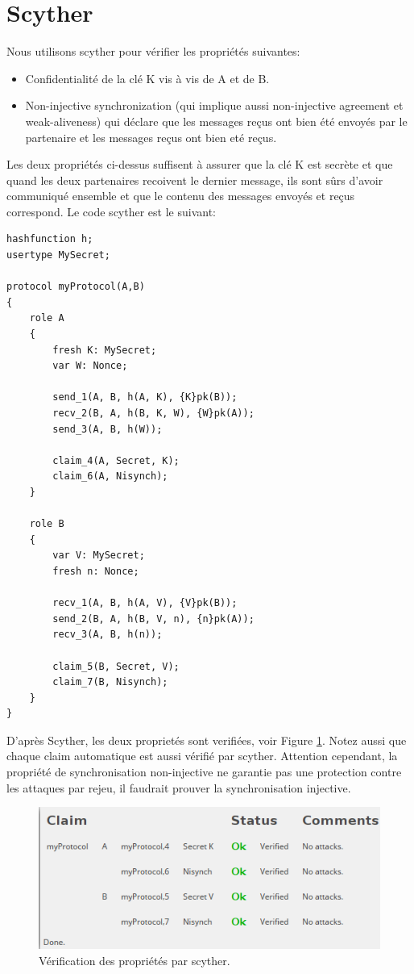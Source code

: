 \documentclass[10pt,a4paper]{article}
\begin{document}
\section{Scyther}
Nous utilisons scyther pour vérifier les propriétés suivantes:
\begin{itemize}
 \item Confidentialité de la clé K vis à vis de A et de B.
 \item Non-injective synchronization (qui implique aussi non-injective agreement et weak-aliveness) qui déclare que les messages reçus ont bien été envoyés par le partenaire et les messages reçus ont bien eté reçus.
\end{itemize}
Les deux propriétés ci-dessus suffisent à assurer que la clé K est secrète et que quand les deux partenaires recoivent le dernier message, ils sont sûrs d'avoir communiqué ensemble et que le contenu des messages envoyés et reçus correspond.
Le code scyther est le suivant:
\begin{Verbatim}[fontsize=\scriptsize]
hashfunction h;
usertype MySecret;

protocol myProtocol(A,B)
{
	role A
	{
		fresh K: MySecret;
		var W: Nonce;

		send_1(A, B, h(A, K), {K}pk(B));
		recv_2(B, A, h(B, K, W), {W}pk(A));
		send_3(A, B, h(W));

		claim_4(A, Secret, K);
		claim_6(A, Nisynch);
	}	
	
	role B
	{
		var V: MySecret;
		fresh n: Nonce;

		recv_1(A, B, h(A, V), {V}pk(B));
		send_2(B, A, h(B, V, n), {n}pk(A));
		recv_3(A, B, h(n));

		claim_5(B, Secret, V);
		claim_7(B, Nisynch);
	}
}
\end{Verbatim}
D'après Scyther, les deux proprietés sont verifiées, voir Figure \ref{fig:scyther_proof}. Notez aussi que chaque claim automatique est aussi vérifié par scyther.
Attention cependant, la propriété de synchronisation non-injective ne garantie pas une protection contre les attaques par rejeu, il faudrait prouver la synchronisation injective.

\begin{figure}[h]
\label{fig:scyther_proof}
\centering
\includegraphics[scale=.5]{scyther_proof}
\caption{Vérification des propriétés par scyther.}
\end{figure}
\end{document}
